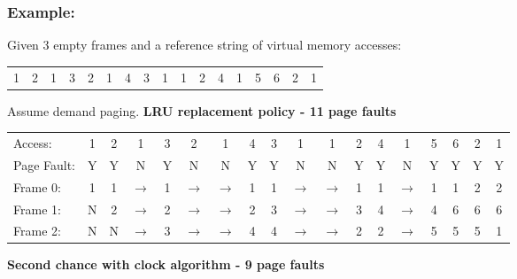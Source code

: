\documentclass{report}
\begin{document}
        \subsubsection{Example:}
            Given 3 empty frames and a reference string of virtual memory accesses:
            \begin{center}
                \begin{tabular}{c c c c c c c c c c c c c c c c c}
                    1 & 2 & 1 & 3 & 2 & 1 & 4 & 3 & 1 & 1 & 2 & 4 & 1 & 5 & 6 & 2 & 1 \\
                \end{tabular}
            \end{center}
            Assume demand paging.
            \textbf{LRU replacement policy - 11 page faults}
            \begin{center}
                \begin{tabular}{l c c c c c c c c c c c c c c c c c}
                    Access:     & 1 & 2 & 1 & 3 & 2 & 1 & 4 & 3 & 1 & 1 & 2 & 4 & 1 & 5 & 6 & 2 & 1 \\
                    Page Fault: & Y & Y & N & Y & N & N & Y & Y & N & N & Y & Y & N & Y & Y & Y & Y\\
                    Frame 0:    & 1 & 1 & $\to$ & 1 & $\to$ & $\to$ & 1 & 1 & $\to$ & $\to$ & 1 & 1 & $\to$ & 1 & 1 & 2 & 2 \\
                    Frame 1:    & N & 2 & $\to$ & 2 & $\to$ & $\to$ & 2 & 3 & $\to$ & $\to$ & 3 & 4 & $\to$ & 4 & 6 & 6 & 6 \\
                    Frame 2:    & N & N & $\to$ & 3 & $\to$ & $\to$ & 4 & 4 & $\to$ & $\to$ & 2 & 2 & $\to$ & 5 & 5 & 5 & 1 \\
                \end{tabular}
            \end{center}
            \textbf{Second chance with clock algorithm - 9 page faults}
\end{document}
